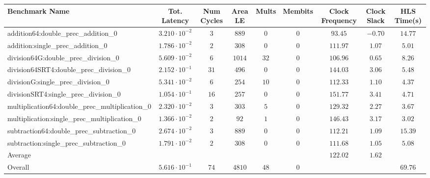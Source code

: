 \begin{tabular}{|l|c|c|c|c|c|c|c|c|}
\hline
Benchmark Name                                   & Tot. Latency            & Num Cycles & Area LE  & Mults  & Membits & Clock Frequency & Clock Slack & HLS Time(s) \\
\hline
addition64:double\_prec\_addition\_0             & $ 3.210 \cdot 10^{-2} $ & $ 3      $ & $ 889  $ & $ 0  $ & $ 0   $ & $ 93.45       $ & $ -0.70   $ & $ 14.77   $ \\
addition:single\_prec\_addition\_0               & $ 1.786 \cdot 10^{-2} $ & $ 2      $ & $ 308  $ & $ 0  $ & $ 0   $ & $ 111.97      $ & $ 1.07    $ & $ 5.01    $ \\
division64G:double\_prec\_division\_0            & $ 5.609 \cdot 10^{-2} $ & $ 6      $ & $ 1014 $ & $ 32 $ & $ 0   $ & $ 106.96      $ & $ 0.65    $ & $ 8.26    $ \\
division64SRT4:double\_prec\_division\_0         & $ 2.152 \cdot 10^{-1} $ & $ 31     $ & $ 496  $ & $ 0  $ & $ 0   $ & $ 144.03      $ & $ 3.06    $ & $ 5.48    $ \\
divisionG:single\_prec\_division\_0              & $ 5.341 \cdot 10^{-2} $ & $ 6      $ & $ 254  $ & $ 10 $ & $ 0   $ & $ 112.33      $ & $ 1.10    $ & $ 4.37    $ \\
divisionSRT4:single\_prec\_division\_0           & $ 1.054 \cdot 10^{-1} $ & $ 16     $ & $ 257  $ & $ 0  $ & $ 0   $ & $ 151.77      $ & $ 3.41    $ & $ 4.71    $ \\
multiplication64:double\_prec\_multiplication\_0 & $ 2.320 \cdot 10^{-2} $ & $ 3      $ & $ 303  $ & $ 5  $ & $ 0   $ & $ 129.32      $ & $ 2.27    $ & $ 3.67    $ \\
multiplication:single\_prec\_multiplication\_0   & $ 1.366 \cdot 10^{-2} $ & $ 2      $ & $ 92   $ & $ 1  $ & $ 0   $ & $ 146.43      $ & $ 3.17    $ & $ 3.02    $ \\
subtraction64:double\_prec\_subtraction\_0       & $ 2.674 \cdot 10^{-2} $ & $ 3      $ & $ 889  $ & $ 0  $ & $ 0   $ & $ 112.21      $ & $ 1.09    $ & $ 15.39   $ \\
subtraction:single\_prec\_subtraction\_0         & $ 1.791 \cdot 10^{-2} $ & $ 2      $ & $ 308  $ & $ 0  $ & $ 0   $ & $ 111.68      $ & $ 1.05    $ & $ 5.08    $ \\
\hline
Average                                          & $                     $ & $        $ & $      $ & $    $ & $     $ & $ 122.02      $ & $ 1.62    $ & $         $ \\
\hline
Overall                                          & $ 5.616 \cdot 10^{-1} $ & $ 74     $ & $ 4810 $ & $ 48 $ & $ 0   $ & $             $ & $         $ & $ 69.76   $ \\
\hline
\end{tabular}
